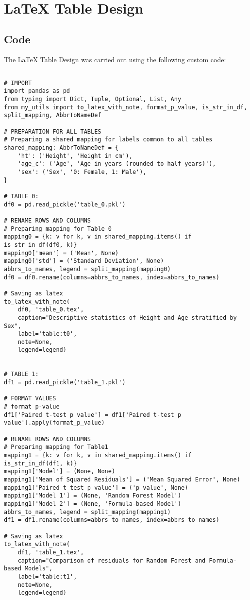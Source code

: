 \documentclass[11pt]{article}
\begin{document}
\section{LaTeX Table Design}
\subsection{{Code}}
The LaTeX Table Design was carried out using the following custom code:

\begin{verbatim}

# IMPORT
import pandas as pd
from typing import Dict, Tuple, Optional, List, Any
from my_utils import to_latex_with_note, format_p_value, is_str_in_df, split_mapping, AbbrToNameDef

# PREPARATION FOR ALL TABLES
# Preparing a shared mapping for labels common to all tables
shared_mapping: AbbrToNameDef = {
    'ht': ('Height', 'Height in cm'),
    'age_c': ('Age', 'Age in years (rounded to half years)'),
    'sex': ('Sex', '0: Female, 1: Male'),
}
    
# TABLE 0:
df0 = pd.read_pickle('table_0.pkl')

# RENAME ROWS AND COLUMNS
# Preparing mapping for Table 0
mapping0 = {k: v for k, v in shared_mapping.items() if is_str_in_df(df0, k)}
mapping0['mean'] = ('Mean', None)  
mapping0['std'] = ('Standard Deviation', None) 
abbrs_to_names, legend = split_mapping(mapping0)
df0 = df0.rename(columns=abbrs_to_names, index=abbrs_to_names)

# Saving as latex
to_latex_with_note(
    df0, 'table_0.tex',
    caption="Descriptive statistics of Height and Age stratified by Sex", 
    label='table:t0',
    note=None,
    legend=legend)


# TABLE 1:
df1 = pd.read_pickle('table_1.pkl')

# FORMAT VALUES
# format p-value
df1['Paired t-test p value'] = df1['Paired t-test p value'].apply(format_p_value)

# RENAME ROWS AND COLUMNS
# Preparing mapping for Table1
mapping1 = {k: v for k, v in shared_mapping.items() if is_str_in_df(df1, k)}
mapping1['Model'] = (None, None)
mapping1['Mean of Squared Residuals'] = ('Mean Squared Error', None)
mapping1['Paired t-test p value'] = ('p-value', None)
mapping1['Model 1'] = (None, 'Random Forest Model')
mapping1['Model 2'] = (None, 'Formula-based Model')
abbrs_to_names, legend = split_mapping(mapping1)
df1 = df1.rename(columns=abbrs_to_names, index=abbrs_to_names)

# Saving as latex
to_latex_with_note(
    df1, 'table_1.tex',
    caption="Comparison of residuals for Random Forest and Formula-based Models", 
    label='table:t1',
    note=None,
    legend=legend)

\end{verbatim}
\end{document}
